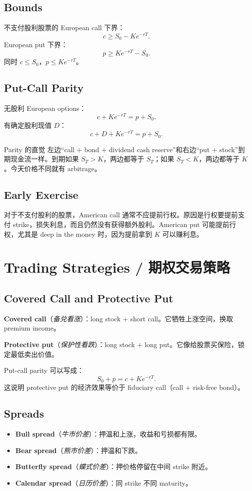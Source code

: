 \documentclass[11pt,a4paper,openany]{ctexbook}
\newcommand{\term}[2]{\textbf{#1}（\emph{#2}）}
\newcommand{\source}[1]{\par\smallskip\noindent{\small\textcolor{muted}{Source: #1}}\par}
\begin{document}
\section{Bounds}
不支付股利股票的 European call 下界：
\[
c\geq S_0-Ke^{-rT}.
\]
European put 下界：
\[
p\geq Ke^{-rT}-S_0.
\]
同时 $c\leq S_0$，$p\leq Ke^{-rT}$。

\section{Put-Call Parity}
无股利 European options：
\[
c+Ke^{-rT}=p+S_0.
\]
有确定股利现值 $D$：
\[
c+D+Ke^{-rT}=p+S_0.
\]

\begin{intuitionbox}{Parity 的直觉}
左边“call + bond + dividend cash reserve”和右边“put + stock”到期现金流一样。到期如果 $S_T>K$，两边都等于 $S_T$；如果 $S_T<K$，两边都等于 $K$。今天价格不同就有 arbitrage。
\end{intuitionbox}

\section{Early Exercise}
对于不支付股利的股票，American call 通常不应提前行权。原因是行权要提前支付 strike，损失利息，而且仍然没有获得额外股利。American put 可能提前行权，尤其是 deep in the money 时，因为提前拿到 $K$ 可以赚利息。

\chapter{Trading Strategies / 期权交易策略}
\source{Lecture 11; Assignment 3}

\section{Covered Call and Protective Put}
\term{Covered call}{备兑看涨}：long stock + short call。它牺牲上涨空间，换取 premium income。

\term{Protective put}{保护性看跌}：long stock + long put。它像给股票买保险，锁定最低卖出价值。

Put-call parity 可以写成：
\[
S_0+p=c+Ke^{-rT}.
\]
这说明 protective put 的经济效果等价于 fiduciary call（call + risk-free bond）。

\section{Spreads}
\begin{itemize}
  \item \term{Bull spread}{牛市价差}：押温和上涨，收益和亏损都有限。
  \item \term{Bear spread}{熊市价差}：押温和下跌。
  \item \term{Butterfly spread}{蝶式价差}：押价格停留在中间 strike 附近。
  \item \term{Calendar spread}{日历价差}：同 strike 不同 maturity。
\end{itemize}
\end{document}
